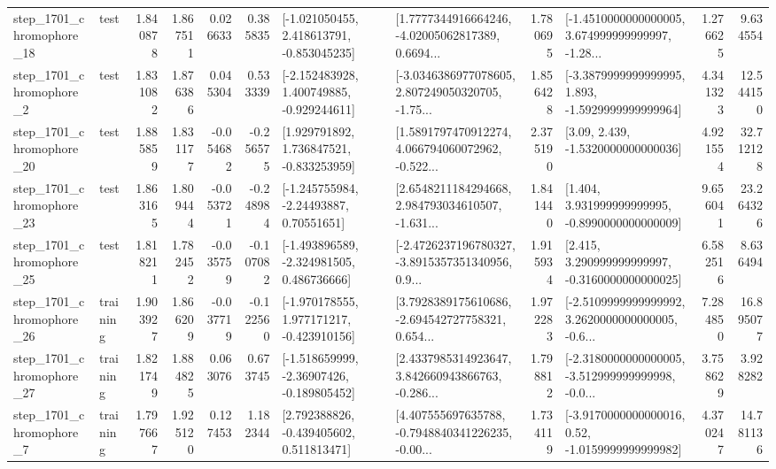\begin{tabular}{llrrrrllrlrr}
 step\_1701\_chromophore\_18 &      test &      1.840878 &    1.867511 &      0.026633 &  0.385835 &   [-1.021050455, 2.418613791, -0.853045235] &  [1.7777344916664246, -4.02005062817389, 0.6694... &       1.780695 &  [-1.4510000000000005, 3.674999999999997, -1.28... &            1.276625 &          9.634554 \\
  step\_1701\_chromophore\_2 &      test &      1.831082 &    1.876386 &      0.045304 &  0.533339 &   [-2.152483928, 1.400749885, -0.929244611] &  [-3.0346386977078605, 2.807249050320705, -1.75... &       1.856428 &  [-3.3879999999999995, 1.893, -1.5929999999999964] &            4.341323 &         12.544150 \\
 step\_1701\_chromophore\_20 &      test &      1.885859 &    1.831177 &     -0.054682 & -0.256575 &    [1.929791892, 1.736847521, -0.833253959] &  [1.5891797470912274, 4.066794060072962, -0.522... &       2.375190 &                 [3.09, 2.439, -1.5320000000000036] &            4.921554 &         32.712128 \\
 step\_1701\_chromophore\_23 &      test &      1.863165 &    1.809444 &     -0.053721 & -0.248984 &     [-1.245755984, -2.24493887, 0.70551651] &  [2.6548211184294668, 2.984793034610507, -1.631... &       1.841440 &    [1.404, 3.931999999999995, -0.8990000000000009] &            9.656041 &         23.264326 \\
 step\_1701\_chromophore\_25 &      test &      1.818211 &    1.782452 &     -0.035759 & -0.107082 &   [-1.493896589, -2.324981505, 0.486736666] &  [-2.4726237196780327, -3.8915357351340956, 0.9... &       1.915934 &    [2.415, 3.290999999999997, -0.3160000000000025] &            6.582516 &          8.636494 \\
 step\_1701\_chromophore\_26 &  training &      1.903927 &    1.866209 &     -0.037719 & -0.122560 &   [-1.970178555, 1.977171217, -0.423910156] &  [3.7928389175610686, -2.694542727758321, 0.654... &       1.972283 &  [-2.5109999999999992, 3.2620000000000005, -0.6... &            7.284850 &         16.895077 \\
 step\_1701\_chromophore\_27 &  training &      1.821749 &    1.884825 &      0.063076 &  0.673745 &   [-1.518659999, -2.36907426, -0.189805452] &  [2.4337985314923647, 3.842660943866763, -0.286... &       1.798812 &  [-2.3180000000000005, -3.512999999999998, -0.0... &            3.758629 &          3.928282 \\
  step\_1701\_chromophore\_7 &  training &      1.797667 &    1.925120 &      0.127453 &  1.182344 &    [2.792388826, -0.439405602, 0.511813471] &  [4.407555697635788, -0.7948840341226235, -0.00... &       1.734119 &   [-3.9170000000000016, 0.52, -1.0159999999999982] &            4.370247 &         14.781136 \\

\end{tabular}
